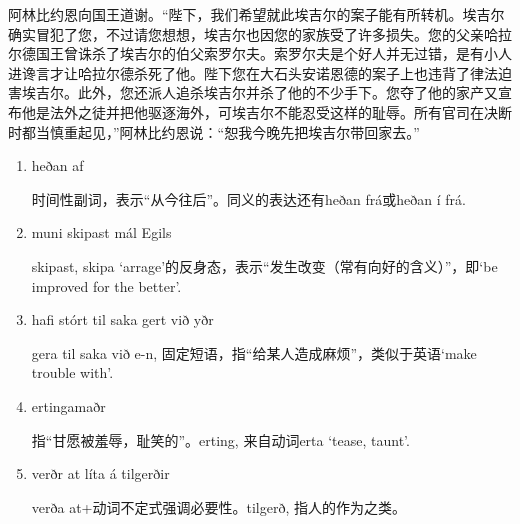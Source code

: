 \begin{translation*}{}
  阿林比约恩向国王道谢。“陛下，我们希望就此埃吉尔的案子能有所转机。埃吉尔确实冒犯了您，不过请您想想，埃吉尔也因您的家族受了许多损失。您的父亲哈拉尔德国王曾诛杀了埃吉尔的伯父索罗尔夫。索罗尔夫是个好人并无过错，是有小人进谗言才让哈拉尔德杀死了他。陛下您在大石头安诺恩德的案子上也违背了律法迫害埃吉尔。此外，您还派人追杀埃吉尔并杀了他的不少手下。您夺了他的家产又宣布他是法外之徒并把他驱逐海外，可埃吉尔不能忍受这样的耻辱。所有官司在决断时都当慎重起见，”阿林比约恩说：“恕我今晚先把埃吉尔带回家去。”
\end{translation*}
\begin{grammar*}{}
  \begin{enumerate}[leftmargin=*]
    \item heðan af

          时间性副词，表示“从今往后”。同义的表达还有heðan frá或heðan í frá.

    \item muni skipast mál Egils

          skipast, skipa `arrage'的反身态，表示“发生改变（常有向好的含义）”，即`be improved for the better'.

    \item hafi stórt til saka gert við yðr

          gera til saka við e-n, 固定短语，指“给某人造成麻烦”，类似于英语`make trouble with'.

    \item ertingamaðr

          指“甘愿被羞辱，耻笑的”。erting, 来自动词erta `tease, taunt'.

    \item verðr at líta á tilgerðir

          verða at+动词不定式强调必要性。tilgerð, 指人的作为之类。
  \end{enumerate}
\end{grammar*}

